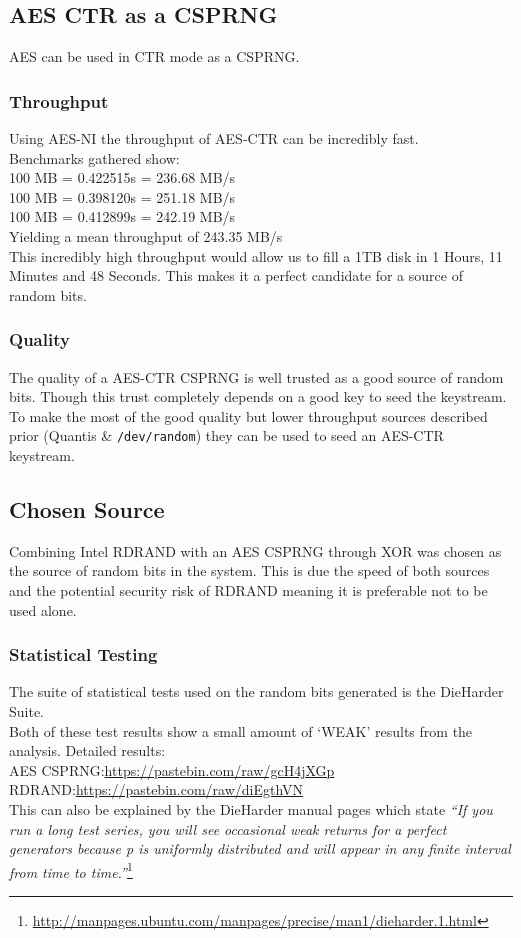 \documentclass{paper}
\begin{document}
		\subsection{AES CTR as a CSPRNG}
			AES can be used in CTR mode as a CSPRNG.\\
			\subsubsection{Throughput}
				Using AES-NI the throughput of AES-CTR can be incredibly fast.\\
				Benchmarks gathered show:\\
				100 MB = 0.422515s = 236.68 MB/s\\
				100 MB = 0.398120s = 251.18 MB/s\\
				100 MB = 0.412899s = 242.19 MB/s\\
				Yielding a mean throughput of 243.35 MB/s\\
				
				This incredibly high throughput would allow us to fill a 1TB disk in 1 Hours, 11 Minutes and 48 Seconds. This makes it a perfect candidate for a source of random bits.\\
			\subsubsection{Quality}
				The quality of a AES-CTR CSPRNG is well trusted as a good source of random bits. Though this trust completely depends on a good key to seed the keystream.\\
				To make the most of the good quality but lower throughput sources described prior (Quantis \& \texttt{/dev/random}) they can be used to seed an AES-CTR keystream.\\
			
		\subsection{Chosen Source}
			Combining Intel RDRAND with an AES CSPRNG through XOR was chosen as the source of random bits in the system. This is due the speed of both sources and the potential security risk of RDRAND meaning it is preferable not to be used alone.
			\subsubsection{Statistical Testing}
			The suite of statistical tests used on the random bits generated is the DieHarder Suite.\\  
			Both of these test results show a small amount of `WEAK' results from the analysis. Detailed results:\\ 
			AES CSPRNG:\url{https://pastebin.com/raw/gcH4jXGp}\\ RDRAND:\url{https://pastebin.com/raw/diEgthVN}\\
			This can also be explained by the DieHarder manual pages which state \textit{``If you run a long test series, you will see occasional weak returns for a perfect generators because p is uniformly distributed and will appear in any finite interval from time to time.''}\footnote{\url{http://manpages.ubuntu.com/manpages/precise/man1/dieharder.1.html}}
		
\end{document}
